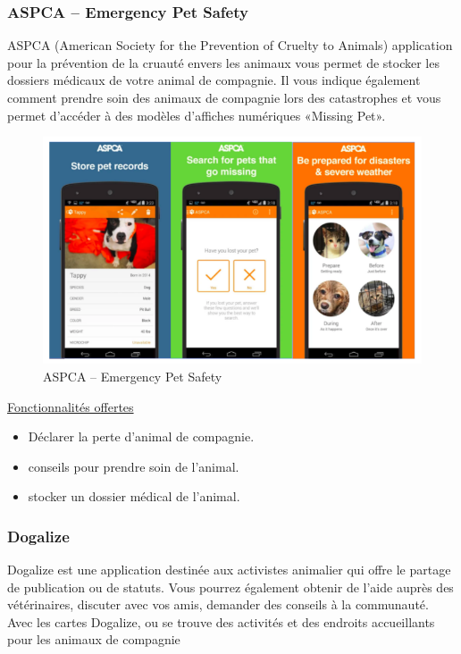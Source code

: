 \documentclass[11pt,a4paper,oneside]{book}
\begin{document}
	\subsubsection{ASPCA – Emergency Pet Safety}
	ASPCA (American Society for the Prevention of Cruelty to Animals) application pour la prévention de la cruauté envers les animaux vous permet de stocker les dossiers médicaux de votre animal de compagnie. Il vous indique également comment prendre soin des animaux de compagnie lors des catastrophes et vous permet d'accéder à des modèles d'affiches numériques «Missing Pet».\\
	\begin{figure}[H]
		\centering
		\includegraphics[width=1\textwidth]{Images/Ch1/ASPCA}
		\caption{ASPCA – Emergency Pet Safety}
		\label{fig:aspca}
	\end{figure}
	
	
	\underline{Fonctionnalités offertes}
	\begin{itemize}
		\item Déclarer la perte d’animal de compagnie.
		\item conseils pour prendre soin de l'animal.
		\item stocker un dossier médical de l’animal.
	\end{itemize} 
	\subsubsection{Dogalize} 
	Dogalize est une application destinée aux activistes animalier qui offre le partage de publication ou de statuts. Vous pourrez également obtenir de l'aide auprès des vétérinaires, discuter avec vos amis, demander des conseils à la communauté. Avec les cartes Dogalize, ou se trouve des activités et des endroits accueillants pour les animaux de compagnie\\
	
\end{document}
